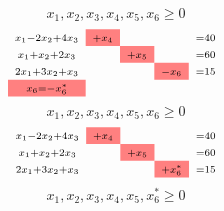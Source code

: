 \begin{frame}
\begin{columns}
\begin{column}{0.55\textwidth}
\begin{mdframed}[backgroundcolor=yellow]
{\begin{equation*}
\begin{matrix}
					\end{matrix}
					\end{equation*}
					\begin{equation*}
					\scriptstyle x_1, x_2, x_3, x_4, x_5, x_6 \ge 0 
					\end{equation*}
				}			
				\only<3>
				{
					\begin{equation*}			
					\begin{matrix}
					\scriptstyle x_1 - 2x_2 + 4x_3 & \cellcolor{red!50} \scriptstyle+x_4 & & & \scriptstyle = 40 \\
					\scriptstyle x_1 + x_2 + 2x_3  & & \cellcolor{red!50} \scriptstyle+x_5 & & \scriptstyle = 60 \\
					\scriptstyle 2x_1 + 3x_2 + x_3 & & & \cellcolor{red!50} \scriptstyle-x_6 & \scriptstyle = 15 \\
					\scriptstyle \cellcolor{red!50} x_6 = -x_6^{*} & & & &\\
					\end{matrix}
					\end{equation*}
					\begin{equation*}
					\scriptstyle x_1, x_2, x_3, x_4, x_5, x_6 \ge 0 
					\end{equation*}
				}			
				\only<4-6>
				{
					\begin{equation*}			
					\begin{matrix}
					\scriptstyle x_1 - 2x_2 + 4x_3 & \cellcolor{red!50} \scriptstyle+x_4 & & & \scriptstyle = 40 \\
					\scriptstyle x_1 + x_2 + 2x_3  & & \cellcolor{red!50} \scriptstyle+x_5 & & \scriptstyle = 60 \\
					\scriptstyle 2x_1 + 3x_2 + x_3 & & & \cellcolor{red!50} \scriptstyle+x_6^{*} & \scriptstyle = 15 \\
					\end{matrix}
					\end{equation*}
					\begin{equation*}
					\scriptstyle x_1, x_2, x_3, x_4, x_5, x_6^{*} \ge 0 
					\end{equation*}
				}			
			\end{mdframed}
		\end{column}
	\end{columns}
	

\end{frame}
